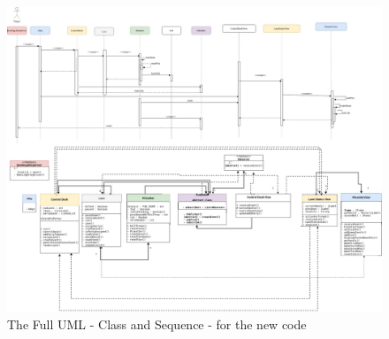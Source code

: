 \begin{figure}[H]
    \centering
    \includegraphics[width = \textwidth]{uml/New_full.jpg}
    \caption{The Full UML - Class and Sequence - for the new code}
\end{figure}

